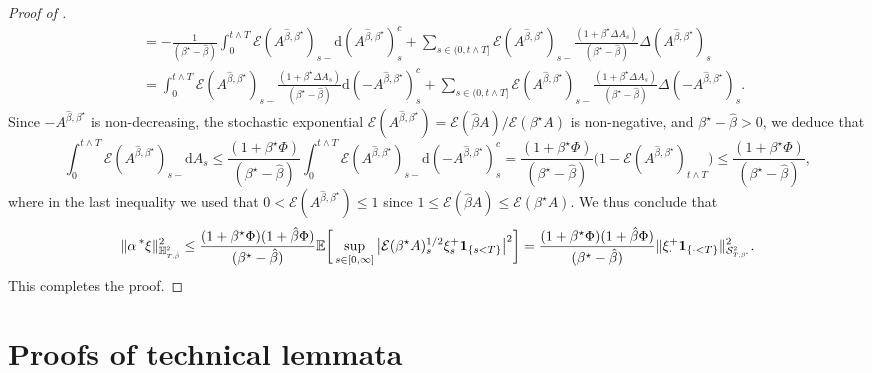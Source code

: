 \documentclass[10pt]{article} %
\newcommand\cE{\mathcal E}
\newcommand\cS{\mathcal S}
\newcommand{\smalltext}[1]{\text{\fontsize{4}{4}\selectfont$#1$}}
\def \E{\mathbb{E}}
\def \H{\mathbb{H}}
\newcommand{\brs}[1]{\prescript{\ast}{}{#1}}
\newcommand{\1}{\mathbf{1}}
\def\d{\mathrm{d}}
\begin{document}
\begin{proof}[Proof of ]
\begin{align*}
		&= -\frac{1}{(\beta^\star-\hat\beta)}\int_0^{t \land T}\cE(A^{\hat\beta,\beta^\star})_{s-}\d (A^{\hat\beta,\beta^\star})^c_s + \sum_{s \in (0,t \land T]}\cE(A^{\hat\beta,\beta^\star})_{s-} \frac{(1+\beta^\star \Delta A_s)}{(\beta^\star-\hat\beta)} \Delta (A^{\hat\beta,\beta^\star})_s \\
		&= \int_0^{t \land T}\cE(A^{\hat\beta,\beta^\star})_{s-}\frac{(1+\beta^\star\Delta A_s)}{(\beta^\star-\hat\beta)}\d (-A^{\hat\beta,\beta^\star})^c_s + \sum_{s \in (0,t \land T]}\cE(A^{\hat\beta,\beta^\star})_{s-} \frac{(1+\beta^\star \Delta A_s)}{(\beta^\star-\hat\beta)} \Delta (-A^{\hat\beta,\beta^\star})_s.
	\end{align*}
	Since $-A^{\hat\beta,\beta^\star}$ is non-decreasing, the stochastic exponential $\cE(A^{\hat\beta,\beta^\star}) = \cE(\hat\beta A)/\cE(\beta^\star A)$ is non-negative, and $\beta^\star - \hat\beta > 0$, we deduce that
	\begin{equation*}
		\int_0^{t \land T}\cE(A^{\hat\beta,\beta^\star})_{s-}\d A_s \leq \frac{(1+\beta^\star \Phi)}{(\beta^\star-\hat\beta)} \int_0^{t \land T} \cE(A^{\hat\beta,\beta^\star})_{s-}\d (-A^{\hat\beta,\beta^\star})^c_s = \frac{(1+\beta^\star \Phi)}{(\beta^\star-\hat\beta)} \bigg(1- \cE(A^{\hat\beta,\beta^\star})_{t \land T}\bigg) \leq \frac{(1+\beta^\star \Phi)}{(\beta^\star-\hat\beta)},
	\end{equation*}
	where in the last inequality we used that $0 < \cE(A^{\hat\beta,\beta^\star}) \leq 1$ since $1 \leq \cE(\hat\beta A) \leq \cE(\beta^\star A)$. We thus conclude that
	\begin{equation*}
		\|\alpha \brs{\xi}\|_{\H^\smalltext{2}_{\smalltext{T}\smalltext{,}\smalltext{\hat\beta}}}^2 
		\leq \frac{(1+\beta^\star \Phi)(1+\hat\beta \Phi)}{(\beta^\star-\hat\beta)}\E\bigg[\sup_{s \in [0,\infty]}\big|\cE(\beta^\star A)^{1/2}_s\xi^+_s\mathbf{1}_{\{s < T\}}\big|^2\bigg] 
		= \frac{(1+\beta^\star \Phi)(1+\hat\beta \Phi)}{(\beta^\star-\hat\beta)}\|\xi^+_\cdot \mathbf{1}_{\{\cdot < T\}}\|^2_{\cS^\smalltext{2}_{\smalltext{T}\smalltext{,}\smalltext{\beta^\star}}}.
	\end{equation*}
	This completes the proof.
\end{proof}

\section{Proofs of technical lemmata}\label{app::proofs_sec_main_results}\label{sec::optimal_stopping_proofs_technical}
\end{document}
